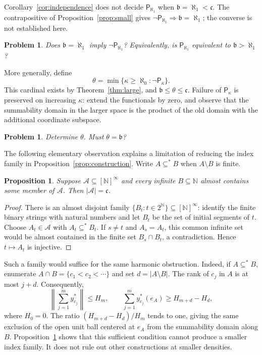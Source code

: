 \documentclass[10pt,a4paper]{amsart}
\newtheorem{proposition}[theorem]{Proposition}
\newtheorem{problem}[theorem]{Problem}
\newcommand{\N}{\mathbb N}
\newcommand{\cfrak}{\mathfrak c}
\begin{document}
Corollary~\ref{cor:independence} does not decide
$\mathsf P_{\aleph_1}$ when $\mathfrak b=\aleph_1<\cfrak$.
The contrapositive of Proposition~\ref{prop:small} gives
$\neg\mathsf P_{\aleph_1}\Rightarrow\mathfrak b=\aleph_1$;
the converse is not established here.

\begin{problem}\label{prob:omegaone}
Does $\mathfrak b=\aleph_1$ imply $\neg\mathsf P_{\aleph_1}$?
Equivalently, is $\mathsf P_{\aleph_1}$ equivalent to
$\mathfrak b>\aleph_1$?
\end{problem}

More generally, define
\[
 \theta=\min\{\kappa\geqslant\aleph_0:\neg\mathsf P_\kappa\}.
\]
This cardinal exists by Theorem~\ref{thm:large}, and
$\mathfrak b\leqslant\theta\leqslant\cfrak$.
Failure of $\mathsf P_\kappa$ is preserved on increasing $\kappa$:
extend the functionals by zero, and observe that the summability domain
in the larger space is the product of the old domain with the
additional coordinate subspace.

\begin{problem}\label{prob:threshold}
Determine $\theta$. Must $\theta=\mathfrak b$?
\end{problem}

The following elementary observation explains a limitation of reducing
the index family in Proposition~\ref{prop:construction}. Write
$A\subseteq^*B$ when $A\setminus B$ is finite.

\begin{proposition}\label{prop:coinitial}
Suppose $\mathcal A\subseteq[\N]^\infty$ and every infinite
$B\subseteq\N$ almost contains some member of $\mathcal A$.
Then $|\mathcal A|=\cfrak$.
\end{proposition}

\begin{proof}
There is an almost disjoint family
$\{B_t:t\in2^{\N}\}\subseteq[\N]^\infty$: identify the finite
binary strings with natural numbers and let $B_t$ be the set of
initial segments of $t$. Choose $A_t\in\mathcal A$ with
$A_t\subseteq^*B_t$. If $s\neq t$ and $A_s=A_t$, this common
infinite set would be almost contained in the finite set
$B_s\cap B_t$, a contradiction. Hence $t\mapsto A_t$ is injective.
\end{proof}

Such a family would suffice for the same harmonic obstruction. Indeed,
if $A\subseteq^*B$, enumerate $A\cap B=\{c_1<c_2<\cdots\}$ and set
$d=|A\setminus B|$. The rank of $c_j$ in $A$ is at most $j+d$.
Consequently,
\[
 \left\|\sum_{j=1}^m y_{c_j}^*\right\|\leqslant H_m,
 \qquad
 \sum_{j=1}^m y_{c_j}^*(e_A)\geqslant H_{m+d}-H_d,
\]
where $H_0=0$. The ratio $(H_{m+d}-H_d)/H_m$ tends to one, giving
the same exclusion of the open unit ball centered at $e_A$ from the
summability domain along $B$. Proposition~\ref{prop:coinitial} shows
that this sufficient condition cannot produce a smaller index family.
It does not rule out other constructions at smaller densities.
\end{document}
